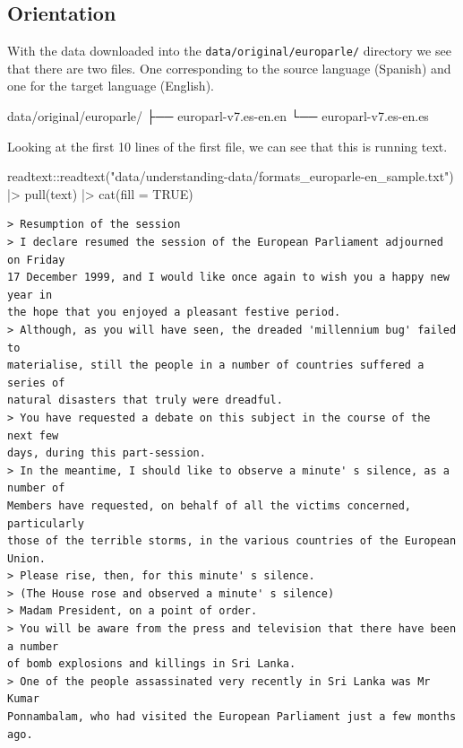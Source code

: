 \documentclass[
  letterpaper,
]{latex/krantz}
\newenvironment{Shaded}{\begin{snugshade}}{\end{snugshade}}
\newcommand{\AttributeTok}[1]{\textcolor[rgb]{0.40,0.45,0.13}{#1}}
\newcommand{\ConstantTok}[1]{\textcolor[rgb]{0.56,0.35,0.01}{#1}}
\newcommand{\ExtensionTok}[1]{\textcolor[rgb]{0.00,0.23,0.31}{#1}}
\newcommand{\FunctionTok}[1]{\textcolor[rgb]{0.28,0.35,0.67}{#1}}
\newcommand{\NormalTok}[1]{\textcolor[rgb]{0.00,0.23,0.31}{#1}}
\newcommand{\SpecialCharTok}[1]{\textcolor[rgb]{0.37,0.37,0.37}{#1}}
\newcommand{\StringTok}[1]{\textcolor[rgb]{0.13,0.47,0.30}{#1}}
\begin{document}
\hypertarget{orientation}{%
\subsection{Orientation}\label{orientation}}

With the data downloaded into the \texttt{data/original/europarle/}
directory we see that there are two files. One corresponding to the
source language (Spanish) and one for the target language (English).

\begin{Shaded}
\begin{Highlighting}[]
\ExtensionTok{data/original/europarle/}
\ExtensionTok{├──}\NormalTok{ europarl{-}v7.es{-}en.en}
\ExtensionTok{└──}\NormalTok{ europarl{-}v7.es{-}en.es}
\end{Highlighting}
\end{Shaded}

Looking at the first 10 lines of the first file, we can see that this is
running text.

\begin{Shaded}
\begin{Highlighting}[]
\NormalTok{readtext}\SpecialCharTok{::}\FunctionTok{readtext}\NormalTok{(}\StringTok{"data/understanding{-}data/formats\_europarle{-}en\_sample.txt"}\NormalTok{) }\SpecialCharTok{|\textgreater{}}
  \FunctionTok{pull}\NormalTok{(text) }\SpecialCharTok{|\textgreater{}}
  \FunctionTok{cat}\NormalTok{(}\AttributeTok{fill =} \ConstantTok{TRUE}\NormalTok{)}
\end{Highlighting}
\end{Shaded}

\begin{verbatim}
> Resumption of the session
> I declare resumed the session of the European Parliament adjourned on Friday
17 December 1999, and I would like once again to wish you a happy new year in
the hope that you enjoyed a pleasant festive period.
> Although, as you will have seen, the dreaded 'millennium bug' failed to
materialise, still the people in a number of countries suffered a series of
natural disasters that truly were dreadful.
> You have requested a debate on this subject in the course of the next few
days, during this part-session.
> In the meantime, I should like to observe a minute' s silence, as a number of
Members have requested, on behalf of all the victims concerned, particularly
those of the terrible storms, in the various countries of the European Union.
> Please rise, then, for this minute' s silence.
> (The House rose and observed a minute' s silence)
> Madam President, on a point of order.
> You will be aware from the press and television that there have been a number
of bomb explosions and killings in Sri Lanka.
> One of the people assassinated very recently in Sri Lanka was Mr Kumar
Ponnambalam, who had visited the European Parliament just a few months ago.
\end{verbatim}
\end{document}
